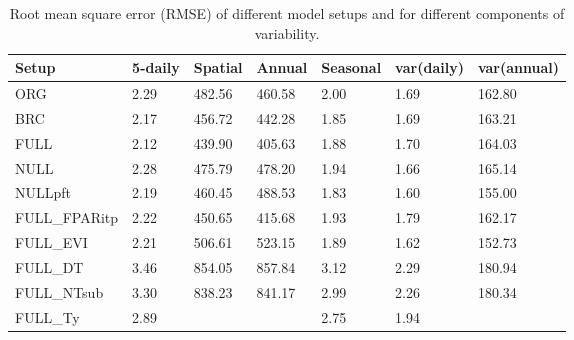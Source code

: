 \documentclass{myreport}
\begin{document}


\begin{table}
\centering
\begin{tabular}{lllllll}
  \toprule
  Setup & 5-daily & Spatial & Annual & Seasonal & var(daily) & var(annual) \\ 
  \midrule
  ORG & 2.29 & 482.56 & 460.58 & 2.00 & 1.69 & 162.80 \\ 
  BRC & 2.17 & 456.72 & 442.28 & 1.85 & 1.69 & 163.21 \\ 
  FULL & 2.12 & 439.90 & 405.63 & 1.88 & 1.70 & 164.03 \\ 
  NULL & 2.28 & 475.79 & 478.20 & 1.94 & 1.66 & 165.14 \\ 
  NULLpft & 2.19 & 460.45 & 488.53 & 1.83 & 1.60 & 155.00 \\ 
  \midrule
  FULL\_FPARitp & 2.22 & 450.65 & 415.68 & 1.93 & 1.79 & 162.17 \\ 
  FULL\_EVI & 2.21 & 506.61 & 523.15 & 1.89 & 1.62 & 152.73 \\ 
  \midrule
  FULL\_DT & 3.46 & 854.05 & 857.84 & 3.12 & 2.29 & 180.94 \\ 
  FULL\_NTsub & 3.30 & 838.23 & 841.17 & 2.99 & 2.26 & 180.34 \\ 
  FULL\_Ty & 2.89 &  &  & 2.75 & 1.94 &  \\ 
  \bottomrule
  \end{tabular}
\caption{Root mean square error (RMSE) of different model setups and for different components of variability.} 
\label{tab:rmse}
\end{table}


\clearpage
\end{document}
